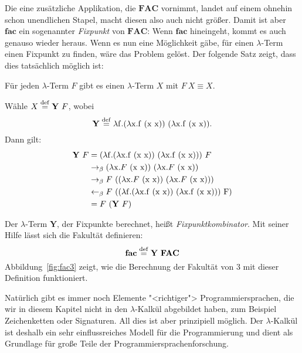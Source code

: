 Die eine zusätzliche Applikation, die $\mathbf{FAC}$ vornimmt, landet
auf einem ohnehin schon unendlichen Stapel,
macht diesen also auch nicht größer.  Damit ist aber $\mathbf{fac}$ ein sogenannter
\textit{Fixpunkt} von $\mathbf{FAC}$:  Wenn $\mathbf{fac}$
hineingeht, kommt es auch genauso wieder heraus.  Wenn es nun eine
Möglichkeit gäbe, für einen $\lambda$-Term einen Fixpunkt zu finden,
wäre das Problem gelöst.  Der folgende Satz zeigt, dass dies tatsächlich
möglich ist:
%
\begin{satz}[Fixpunktsatz]
  \label{satz:fixpunkt}
  Für jeden $\lambda$-Term $F$ gibt es einen $\lambda$-Term $X$ mit
  $F~X\equiv X$.
\end{satz}
\begin{beweis}
  Wähle $X \stackrel{\rm def}{=}{} \mathbf{Y}~F$, wobei
  \begin{displaymath}
    \mathbf{Y} \stackrel{\rm def}{=}{} \lambda \mathrm f.(\lambda \mathrm x.\mathrm f~(\mathrm x~\mathrm x))~(\lambda \mathrm x.\mathrm f~(\mathrm x~\mathrm x)).
  \end{displaymath}
  Dann gilt:
  \begin{displaymath}
    \begin{split}
      \mathbf{Y}~F & = (\lambda \mathrm f.(\lambda \mathrm x.\mathrm f~(\mathrm x~\mathrm x))~(\lambda \mathrm x.\mathrm f~(\mathrm x~\mathrm x)))~F
      \\ & \rightarrow_\beta
      (\lambda \mathrm x.F~(\mathrm x~\mathrm x))~(\lambda \mathrm x.F~(\mathrm x~\mathrm x))
      \\ & \rightarrow_\beta
      F~((\lambda \mathrm x.F~(\mathrm x~\mathrm x))~(\lambda \mathrm x.F~(\mathrm x~\mathrm x)))
      \\ & \leftarrow_\beta
      F~((\lambda \mathrm f.(\lambda \mathrm x.\mathrm f~(\mathrm x~\mathrm x))~(\lambda \mathrm x.\mathrm f~(\mathrm x~\mathrm x)))~\mathrm F)
      \\ & =
      F~(\mathbf{Y}~F)
    \end{split}
  \end{displaymath}
\end{beweis}
%
Der $\lambda$-Term $\mathbf{Y}$, der Fixpunkte
berechnet, heißt
\textit{Fixpunktkombinator}.  Mit seiner Hilfe lässt sich
die Fakultät definieren:
%
\begin{displaymath}
  \mathbf{fac} \stackrel{\rm def}{=}{} \mathbf{Y}~\mathbf{FAC}
\end{displaymath}
%
Abbildung~\ref{fig:fac3} zeigt, wie die Berechnung der Fakultät von
$3$ mit dieser Definition funktioniert.

Natürlich gibt es immer noch Elemente "<richtiger">
Programmiersprachen, die wir in diesem Kapitel nicht in den
$\lambda$-Kalkül abgebildet haben, zum Beispiel Zeichenketten oder
Signaturen.  All dies ist aber prinzipiell möglich.  Der
$\lambda$-Kalkül ist deshalb ein sehr einflussreiches Modell für die
Programmierung und dient als Grundlage für große Teile der
Programmiersprachenforschung.

